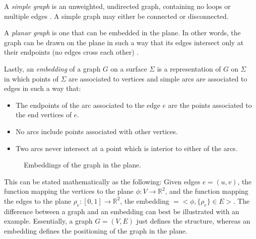 \documentclass[11pt]{article}
\newcommand{\R}{\mathbb{R}}
\begin{document}
  A \emph{simple graph} is an unweighted, undirected graph, containing no loops or multiple edges \cite{mathworld:SimpleGraphs}. 
  A simple graph may either be connected or disconnected.
  
  A \emph{planar graph} is one that can be embedded in the plane. 
  In other words, the graph can be drawn on the plane in such a way that its edges intersect only at their endpoints (no edges cross each other) \cite{mathworld:PlanarGraph}.
  
  Lastly, an \emph{embedding} of a graph $G$ on a surface $\Sigma$ is a representation of $G$ on $\Sigma$ in which points of $\Sigma$ are associated to vertices and simple arcs are associated to edges in such a way that:
  \begin{itemize}
	\item The endpoints of the arc associated to the edge $e$ are the points associated to the end vertices of $e$.
	\item No arcs include points associated with other vertices.
	\item Two arcs never intersect at a point which is interior to either of the arcs.
  \end{itemize}
  
  \begin{figure}%
	\centering
	\qquad
	\caption[]{Embeddings of the graph in the plane.}%
	\label{fig:embedding}
\end{figure}

  This can be stated mathematically as the following: Given edges $e=(u,v)$, the function mapping the vertices to the plane $ \phi :V \rightarrow \R^2$, and the function mapping the edges to the plane $ \rho_e :[0,1] \rightarrow \R^2$, the embedding $= <\phi, \{\rho_e\} \in E >$. The difference between a graph and an embedding can best be illustrated with an example. Essentially, a graph $G=(V,E)$ just defines the structure, whereas an embedding defines the positioning of the graph in the plane.
\end{document}
